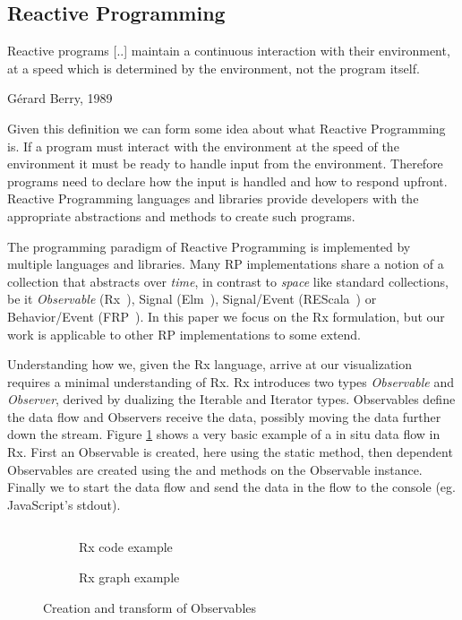 \subsection{Reactive Programming}
\label{nutshell}

\epigraph{Reactive programs [..] maintain a continuous interaction with their environment, at a speed which is determined by the environment, not the program itself.}{Gérard Berry, 1989~\cite{berry1989real}}

Given this definition we can form some idea about what Reactive Programming is. If a program must interact with the environment at the speed of the environment it must be ready to handle input from the environment. Therefore programs need to declare how the input is handled and how to respond upfront. Reactive Programming languages and libraries provide developers with the appropriate abstractions and methods to create such programs.

The programming paradigm of Reactive Programming is implemented by multiple languages and libraries. Many RP implementations share a notion of a collection that abstracts over \textit{time}, in contrast to \textit{space} like standard collections, be it \textit{Observable} (Rx~\cite{meijer2010subject}), Signal (Elm~\cite{czaplicki2012elm}), Signal/Event (REScala~\cite{salvaneschi2014rescala}) or Behavior/Event (FRP~\cite{elliott1997functional}). In this paper we focus on the Rx formulation, but our work is applicable to other RP implementations to some extend. 

Understanding how we, given the Rx language, arrive at our visualization requires a minimal understanding of Rx.
Rx introduces two types \textit{Observable} and \textit{Observer}, derived by dualizing the Iterable and Iterator types. Observables define the data flow and Observers receive the data, possibly moving the data further down the stream. Figure \ref{sample1} shows a very basic example of a in situ data flow in Rx. First an Observable is created, here using the static  method, then dependent Observables are created using the  and  methods on the Observable instance. Finally we  to start the data flow and send the data in the flow to the console (eg. JavaScript's stdout).

\begin{figure}

\begin{subfigure}[a]{\columnwidth}
\inputminted[tabsize=2]{javascript}{listings/sample1.js}	
\caption{Rx code example}
\label{sample1}
\end{subfigure}

\begin{subfigure}[b]{\columnwidth}
\centering

\caption{Rx graph example}
\label{chaincreate}
\end{subfigure}

\caption{Creation and transform of Observables}

\end{figure}

